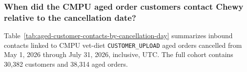 \subsubsection{When did the CMPU aged order customers contact Chewy relative to the cancellation date?}
Table~\ref{tab:aged-customer-contacts-by-cancellation-day} summarizes inbound
contacts linked to CMPU vet-diet \texttt{CUSTOMER\_UPLOAD} aged orders cancelled
from May 1, 2026 through July 31, 2026, inclusive, UTC.
The full cohort contains 30,382 customers and 38,314 aged orders.




\clearpage

